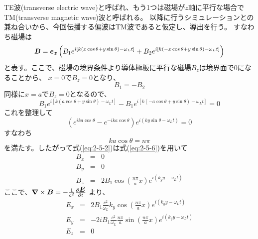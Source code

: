 \documentclass[a4paper,11pt,titlepage]{jarticle}
\newcommand{\bm}[1]{{\mbox{\boldmath $#1$}}}
\numberwithin{equation}{section} %
\begin{document}
  TE波(transverse electric wave)と呼ばれ、もう1つは磁場が$z$軸に平行な場合でTM(transverse magnetic wave)波と呼ばれる。
  以降に行うシミュレーションとの兼ね合いから、今回伝播する偏波はTM波であると仮定し、導出を行う。
  すなわち磁場は
  \begin{equation}
    \label{eq:2-5-2}
    \bm{B} = \bm{e_z} \left( B_1 e^{i[k(x \cos \theta + y \sin \theta ) - \omega_L t ] }
                  + B_2 e^{i[k(-x \cos \theta + y \sin \theta ) - \omega_L t ] }    \right)    
  \end{equation}
  と表す。ここで、磁場の境界条件より導体極板に平行な磁場$B_z$は境界面で0になることから、
  $x=0$で$B_z=0$となり、
  \begin{equation}
    \label{eq:2-5-3}
    B_1 = - B_2
  \end{equation}
  同様に$x=a$で$B_z=0$となるので、
  \begin{equation}
    \label{eq:2-5-4}
            B_1 e^{i[k(a \cos \theta + y \sin \theta ) - \omega_L t ] }
          - B_1 e^{i[k(-a \cos \theta + y \sin \theta ) - \omega_L t ] }    
          = 0 
  \end{equation}
  これを整理して
  \begin{equation}
    \label{eq:2-5-5}
    \left(  e^{ ika \cos \theta } - e^{ -ika \cos \theta } \right) e^{ i \left( ky \sin \theta - \omega_L t  \right) } 
          = 0 
  \end{equation}
  すなわち
  \begin{equation}
    \label{eq:2-5-6}
    ka \cos \theta = n \pi 
  \end{equation} 
  を満たす。したがって式(\ref{eq:2-5-2})は式(\ref{eq:2-5-6})を用いて
  \begin{eqnarray}
    \label{eq:2-5-7}
    B_x &=& 0  \\
    \label{eq:2-5-8}
    B_y &=& 0 \\
    \label{eq:2-5-9}
    B_z &=&  2 B_1 \cos ( \frac{n \pi}{a} x ) e^{ i \left( k_y y - \omega_L t  \right) }
  \end{eqnarray}
  ここで、$ \bm{\nabla} \times \bm{B} = - \frac{1}{c^2} \frac{\partial \bm{E} }{ \partial t } $ より、
  \begin{eqnarray}
    \label{eq:2-5-10}
    E_x &=& 2 B_1 \frac{c^2}{\omega_L} k_y \cos( \frac{n\pi}{a} x ) e^{ i \left( k_y y  - \omega_L t  \right) }  \\
    \label{eq:2-5-11}
    E_y &=& -2 i B_1  \frac{c^2}{\omega_L} \frac{n\pi}{a} \sin ( \frac{n \pi}{a} x ) e^{ i \left( k_y y - \omega_L t  \right) } \\
    \label{eq:2-5-12}
    E_z &=& 0
  \end{eqnarray}
\end{document}
